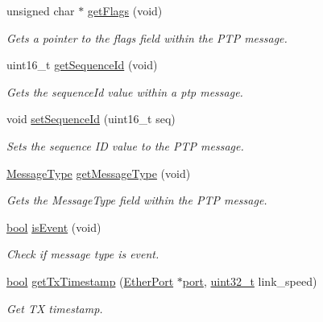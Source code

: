\begin{DoxyCompactItemize}
unsigned char $\ast$ \hyperlink{class_p_t_p_message_common_aa75ce7cb63073d090a15ca2c28b6819a}{get\+Flags} (void)
\begin{DoxyCompactList}\small\item\em Gets a pointer to the flags field within the P\+TP message. \end{DoxyCompactList}\item 
uint16\+\_\+t \hyperlink{class_p_t_p_message_common_abd5cac5701120cbbfc56129b31fa801f}{get\+Sequence\+Id} (void)
\begin{DoxyCompactList}\small\item\em Gets the sequence\+Id value within a ptp message. \end{DoxyCompactList}\item 
void \hyperlink{class_p_t_p_message_common_a7fc215800bddc8a39e50e463ffbe651a}{set\+Sequence\+Id} (uint16\+\_\+t seq)
\begin{DoxyCompactList}\small\item\em Sets the sequence ID value to the P\+TP message. \end{DoxyCompactList}\item 
\hyperlink{avbts__message_8hpp_ac6606ebe91c8ac66a2c314c79f5ab013}{Message\+Type} \hyperlink{class_p_t_p_message_common_aa9e0a02eadc0da0ddbade7fdb09d9309}{get\+Message\+Type} (void)
\begin{DoxyCompactList}\small\item\em Gets the Message\+Type field within the P\+TP message. \end{DoxyCompactList}\item 
\hyperlink{avb__gptp_8h_af6a258d8f3ee5206d682d799316314b1}{bool} \hyperlink{class_p_t_p_message_common_a2dd36fdb6a9dbfcfdab03f6162581373}{is\+Event} (void)
\begin{DoxyCompactList}\small\item\em Check if message type is event. \end{DoxyCompactList}\item 
\hyperlink{avb__gptp_8h_af6a258d8f3ee5206d682d799316314b1}{bool} \hyperlink{class_p_t_p_message_common_a715dccee35cbc56372f8b003600b8ef9}{get\+Tx\+Timestamp} (\hyperlink{class_ether_port}{Ether\+Port} $\ast$\hyperlink{gst__avb__playbin_8c_a63c89c04d1feae07ca35558055155ffb}{port}, \hyperlink{parse_8c_a6eb1e68cc391dd753bc8ce896dbb8315}{uint32\+\_\+t} link\+\_\+speed)
\begin{DoxyCompactList}\small\item\em Get TX timestamp. \end{DoxyCompactList}\item 

\end{DoxyCompactItemize}
